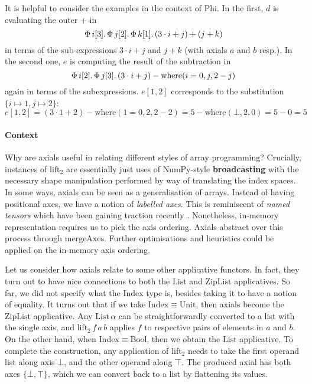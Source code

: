 It is helpful to consider the examples in the context of Phi. In the first, $d$ is evaluating the outer $+$ in $$\Phi\, {i}[{3}] \ldotp {\Phi\, {j}[{2}] \ldotp {\Phi\, {k}[{1}] \ldotp {(3 \cdot i + j) + (j + k)}}}$$ in terms of the sub-expressions $3 \cdot i + j$ and $j + k$ (with axials $a$ and $b$ resp.). In the second one, $e$ is computing the result of the subtraction in 
$$\Phi\, {i}[{2}] \ldotp {\Phi\, {j}[{3}] \ldotp {(3 \cdot i + j) - \mathrm{where}(i = 0, j, 2 - j)}}$$ again in terms of the subexpressions. $e[1, 2]$ corresponds to the substitution $\{ i \mapsto 1, j \mapsto 2 \}$:
$$ e[1, 2] = (3 \cdot 1 + 2) - \mathrm{where}(1 = 0, 2, 2 - 2) = 5 - \mathrm{where}(\bot, 2, 0) = 5 - 0 = 5 $$

\paragraph{Context} Why are axials useful in relating different styles of array programming? Crucially, instances of $\mathrm{lift}_2$ are essentially just uses of NumPy-style \textbf{broadcasting} with the necessary shape manipulation performed by way of translating the index spaces. In some ways, axials can be seen as a generalisation of arrays. Instead of having positional axes, we have a notion of \textit{labelled axes}. This is reminiscent of \textit{named tensors} which have been gaining traction recently \cite{chiang2022named}. Nonetheless, in-memory representation requires us to pick the axis ordering. Axials abstract over this process through $\mathrm{mergeAxes}$. Further optimisations and heuristics could be applied on the in-memory axis ordering.

Let us consider how axials relate to some other applicative functors. In fact, they turn out to have nice connections to both the $\mathrm{List}$ and $\mathrm{ZipList}$ applicatives. So far, we did not specify what the $\mathrm{Index}$ type is, besides taking it to have a notion of equality. It turns out that if we take $\mathrm{Index} \equiv \mathrm{Unit}$, then axials become the $\mathrm{ZipList}$ applicative. Any $\mathrm{List}\,\alpha$ can be straightforwardly converted to a list with the single axis, and $\mathrm{lift}_2\,f\,a\,b$ applies $f$ to respective pairs of elements in $a$ and $b$.
On the other hand, when $\mathrm{Index} \equiv \mathrm{Bool}$, then we obtain the $\mathrm{List}$ applicative. To complete the construction, any application of $\mathrm{lift}_2$ needs to take the first operand list along axis $\bot$, and the other operand along $\top$. The produced axial has both axes $\{ \bot, \top \}$, which we can convert back to a list by flattening its values.


